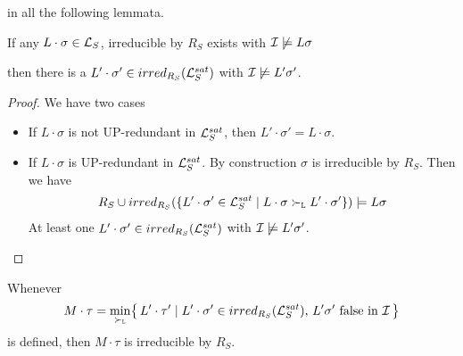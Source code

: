             in all the following lemmata.


        \begin{lemma}\label{existence}

        If any $L\cdot\sigma\in\mathcal{L}_S$, irreducible by $R_S$ exists with $\mathcal{I}\not\models L\sigma$

        then there is a $L'\cdot\sigma'\in irred_{R_S}(\mathcal{L}_S^{sat})$ with $\mathcal{I}\not\models L'\sigma'$.
        \end{lemma}

        \begin{proof}
            We have two cases

        \begin{itemize}
            \item If $L\cdot\sigma$ is not UP-redundant in $\mathcal{L}_S^{sat}$,
            then $L'\cdot\sigma'=L\cdot\sigma$.
            \hfill\checkmark

            \item If $L\cdot\sigma$ is UP-redundant in $\mathcal{L}_S^{sat}$.
        By construction $\sigma$ is irreducible by $R_S$. Then we have
        \begin{align*}
            R_S \cup irred_{R_S}(
                \{
                L'\cdot\sigma'\in\mathcal{L}_S^{sat}
                \mid
                L\cdot\sigma \mathrel\succ_{\mathtt{L}} L'\cdot\sigma'
                \}
            )
            \models
            L\sigma
        \end{align*}
        At least one $L'\cdot\sigma'\in irred_{R_S}(\mathcal{L}_S^{sat})$
        with $\mathcal{I}\not\models L'\sigma'$.
        \hfill\checkmark
        \end{itemize}
    \end{proof}


        \begin{lemma}\label{irreducible}
            Whenever
            \begin{gather*}
                M\cdot\tau = \min_{\mathrel\succ_{\mathtt{L}}}\!
                \left\{\,
                L'\cdot\tau' \mid
                L'\cdot\sigma' \in irred_{R_S}(\mathcal{L}_S^{sat}),\,
                L'\sigma'\text{ false in }\mathcal{I}\,
                \right\}
            \end{gather*}
            is defined, then $M\cdot\tau$ is irreducible by $R_S$.
        \end{lemma}

